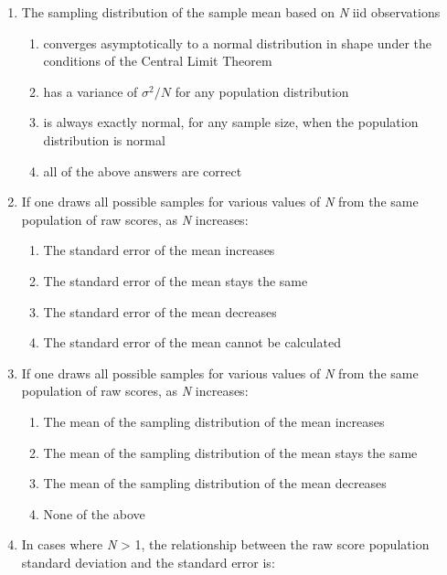 \documentclass[]{article}
\begin{document}
\begin{enumerate}
\def\labelenumi{\arabic{enumi}.}
\setcounter{enumi}{8}
\item
  The sampling distribution of the sample mean based on \emph{N} iid
  observations

  \begin{enumerate}
  \def\labelenumii{\alph{enumii}.}
  \item
    converges asymptotically to a normal distribution in shape under the
    conditions of the Central Limit Theorem
  \item
    has a variance of \(\sigma^2/N\) for any population distribution
  \item
    is always exactly normal, for any sample size, when the population
    distribution is normal
  \item
    all of the above answers are correct
  \end{enumerate}
\item
  If one draws all possible samples for various values of \emph{N} from
  the same population of raw scores, as \emph{N} increases:

  \begin{enumerate}
  \def\labelenumii{\alph{enumii}.}
  \item
    The standard error of the mean increases
  \item
    The standard error of the mean stays the same
  \item
    The standard error of the mean decreases
  \item
    The standard error of the mean cannot be calculated
  \end{enumerate}
\item
  If one draws all possible samples for various values of \emph{N} from
  the same population of raw scores, as \emph{N} increases:

  \begin{enumerate}
  \def\labelenumii{\alph{enumii}.}
  \item
    The mean of the sampling distribution of the mean increases
  \item
    The mean of the sampling distribution of the mean stays the same
  \item
    The mean of the sampling distribution of the mean decreases
  \item
    None of the above
  \end{enumerate}
\item
  In cases where \emph{N} \textgreater{} 1, the relationship between the
  raw score population standard deviation and the standard error is:


\end{enumerate}
\end{document}
